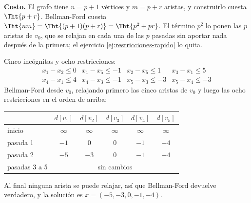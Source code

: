 \documentclass[11pt,letterpaper]{article}
\begin{document}
\textbf{Costo.} El grafo tiene $n = p + 1$ vértices y $m = p + r$
aristas, y construirlo cuesta $\Tht{p + r}$. Bellman-Ford cuesta
$\Tht{nm} = \Tht{(p + 1)(p + r)} = \Tht{p^2 + pr}$. El término $p^2$
lo ponen las $p$ aristas de $v_0$, que se relajan en cada una de las
$p$ pasadas sin aportar nada después de la primera; el ejercicio
\ref{ej:restricciones-rapido} lo quita.

\begin{ejemplo}
  \label{ej:restricciones-24-8}
  Cinco incógnitas y ocho restricciones:
  \[
    \begin{array}{llll}
      x_1 - x_2 \le 0 & x_1 - x_5 \le -1 & x_2 - x_5 \le 1
        & x_3 - x_1 \le 5 \\
      x_4 - x_1 \le 4 & x_4 - x_3 \le -1 & x_5 - x_3 \le -3
        & x_5 - x_4 \le -3
    \end{array}
  \]
  Bellman-Ford desde $v_0$, relajando primero las cinco aristas de
  $v_0$ y luego las ocho restricciones en el orden de arriba:
  \begin{center}
  \small
  \begin{tabular}{lccccc}
    \toprule
    & $d[v_1]$ & $d[v_2]$ & $d[v_3]$ & $d[v_4]$ & $d[v_5]$ \\
    \midrule
    inicio & $\infty$ & $\infty$ & $\infty$ & $\infty$ & $\infty$ \\
    pasada 1 & $-1$ & $0$ & $0$ & $-1$ & $-4$ \\
    pasada 2 & $-5$ & $-3$ & $0$ & $-1$ & $-4$ \\
    pasadas 3 a 5 & \multicolumn{5}{c}{sin cambios} \\
    \bottomrule
  \end{tabular}
  \end{center}
  Al final ninguna arista se puede relajar, así que Bellman-Ford
  devuelve verdadero, y la solución es $x = (-5, -3, 0, -1, -4)$.
  \begin{center}
\end{center}
\end{ejemplo}
\end{document}
